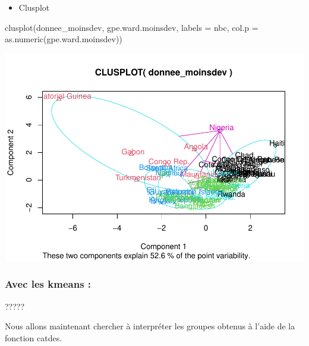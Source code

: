 \documentclass[
]{article}
\newenvironment{Shaded}{}{}
\newcommand{\AttributeTok}[1]{#1}
\newcommand{\DecValTok}[1]{#1}
\newcommand{\FunctionTok}[1]{#1}
\newcommand{\NormalTok}[1]{#1}
\newcommand{\OtherTok}[1]{\textcolor[rgb]{1.00,0.25,0.00}{#1}}
\newcommand{\SpecialCharTok}[1]{\textcolor[rgb]{0.00,0.50,0.50}{#1}}
\providecommand{\tightlist}{%
  \setlength{\itemsep}{0pt}\setlength{\parskip}{0pt}}
\begin{document}
\begin{itemize}
\tightlist
\item
  Clusplot
\end{itemize}

\begin{Shaded}
\begin{Highlighting}[]
\FunctionTok{clusplot}\NormalTok{(donnee\_moinsdev, gpe.ward.moinsdev, }\AttributeTok{labels =}\NormalTok{ nbc, }\AttributeTok{col.p =} \FunctionTok{as.numeric}\NormalTok{(gpe.ward.moinsdev))}
\end{Highlighting}
\end{Shaded}

\includegraphics{Projet_files/figure-latex/unnamed-chunk-38-1.pdf}

\hypertarget{avec-les-kmeans}{%
\subsubsection{Avec les kmeans :}\label{avec-les-kmeans}}

?????

Nous allons maintenant chercher à interpréter les groupes obtenus à
l'aide de la fonction catdes.

\begin{Shaded}
\end{Shaded}
\end{document}
